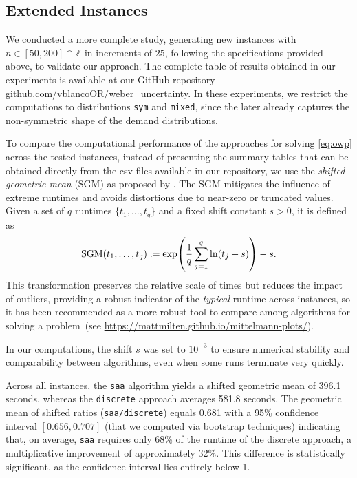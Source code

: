 \documentclass[letter,11pt, reqno]{amsart}
\renewcommand{\;}{\quad}
\theoremstyle{thmstyleone}%
\theoremstyle{thmstyletwo}%
\theoremstyle{thmstylethree}%
\begin{document}
\subsection*{Extended Instances}
We conducted a more complete study, generating new instances with $n \in [50, 200] \cap \mathbb{Z}$ in increments of $25$, following the specifications provided above, to validate our approach. The complete table of results obtained in our experiments is available at our GitHub repository \url{github.com/vblancoOR/weber_uncertainty}. In these experiments, we restrict the computations to distributions \texttt{sym} and \texttt{mixed}, since the later already captures the non-symmetric shape of the demand distributions.

To compare the computational performance of the approaches for solving \ref{eq:owp} across the tested instances, instead of presenting the summary tables that can be obtained directly from the csv files available in our repository,  
we use the \emph{shifted geometric mean} (SGM) as proposed by \citet{DolanMore2002}. 
The SGM mitigates the influence of extreme runtimes and avoids distortions due to near-zero or truncated values. 
Given a set of $q$ runtimes $\{t_1, \ldots, t_q\}$ and a fixed shift constant $s>0$, it is defined as
$$
{\rm SGM}(t_1,\ldots,t_q)
:=\exp\!\left(\frac{1}{q}\sum_{j=1}^q\ln(t_j+s)\right)-s.
$$
This transformation preserves the relative scale of times but reduces the impact of outliers, providing a robust indicator of the \emph{typical} runtime across instances, so it has been recommended as a more robust tool to compare among algorithms for solving a problem~(see \url{https://mattmilten.github.io/mittelmann-plots/}).

In our computations, the shift $s$ was set to $10^{-3}$ to ensure numerical stability and comparability between algorithms, even when some runs terminate very quickly.

Across all instances, the \texttt{saa} algorithm yields a shifted geometric mean of 396.1 seconds, whereas the \texttt{discrete} approach averages 581.8 seconds. 
The geometric mean of shifted ratios (\texttt{saa/discrete}) equals 0.681 with a 95\% confidence interval $[0.656,0.707]$ (that we computed via bootstrap techniques) 
indicating that, on average, \texttt{saa}  requires only 68\% of the runtime of the discrete approach, a multiplicative improvement of approximately 32\%.
This difference is statistically significant, as the confidence interval lies entirely below 1.
\end{document}
